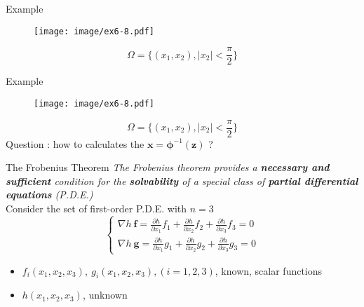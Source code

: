 \documentclass{beamer}
\renewcommand{\vec}[1]{\ensuremath{\boldsymbol{#1}}} %
\begin{document}
\begin{frame}{Example}
    \begin{figure}
      \centering
      \texttt{[image: image/ex6-8.pdf]}
    \end{figure}
    \vspace{-10pt}
    $$
    \Omega = \{ (x_{1}, x_{2}), |x_{2}| < \frac{\pi}{2} \}
    $$
\end{frame}
\begin{frame}{Example}
    \begin{figure}
      \centering
      \texttt{[image: image/ex6-8.pdf]}
    \end{figure}
    \vspace{-10pt}
    $$
    \Omega = \{ (x_{1}, x_{2}), |x_{2}| < \frac{\pi}{2} \}
    $$
    {\color{red}\large Question : how to calculates the $\vec{x}=\vec{\phi}^{-1}(\vec{z})$ ?}
\end{frame}


\begin{frame}{The Frobenius Theorem}
    \textit{The Frobenius theorem provides a \textbf{necessary and sufficient} condition for the \textbf{solvability} of a special class of \textbf{partial differential equations} (P.D.E.)}
    \\
    Consider the set of first-order P.D.E. with $n=3$
    \begin{equation}\label{partial-equation}
      \left\{ \begin{array}{c}
                \nabla h~\vec{f}=\frac{\partial h}{\partial x_{1}}f_{1}+\frac{\partial h}{\partial x_{2}}f_{2}+\frac{\partial h}{\partial x_{3}}f_{3}=0 \\
                \nabla h~\vec{g}=\frac{\partial h}{\partial x_{1}}g_{1}+\frac{\partial h}{\partial x_{2}}g_{2}+\frac{\partial h}{\partial x_{3}}g_{3}=0
              \end{array}\right.
    \end{equation}

    \begin{itemize}
      \item $f_{i}(x_{1},x_{2},x_{3}),~g_{i}(x_{1},x_{2},x_{3}), (i=1,2,3)$, known, scalar functions
      \item $h(x_{1},x_{2},x_{3})$, unknown
    \end{itemize}
\end{frame}
\end{document}
